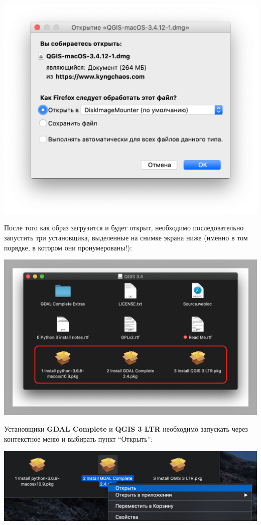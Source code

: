 \documentclass[
  12pt,
]{book}
\begin{document}
\includegraphics{images/installation_instruction_mac/mac01.png}

После того как образ загрузится и будет открыт, необходимо последовательно запустить три установщика, выделенные на снимке экрана ниже (именно в том порядке, в котором они пронумерованы!):

\includegraphics{images/installation_instruction_mac/mac02.png}

Установщики \textbf{GDAL Complete} и \textbf{QGIS 3 LTR} необходимо запускать через контекстное меню и выбирать пункт ``Открыть'':

\includegraphics{images/installation_instruction_mac/mac03.png}
\end{document}
